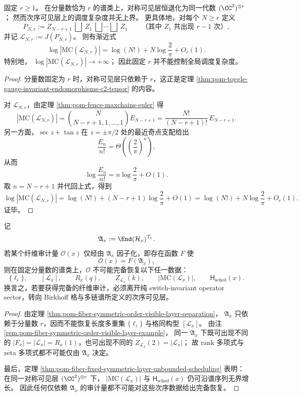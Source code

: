 \begin{theorem}[固定对称可见层下的调度复杂度无界]\label{thm:pom-fiber-fixed-symmetric-layer-unbounded-scheduling}
固定 \(r\ge 1\)。
在分量数恰为 \(r\) 的谱类上，对称可见层恒退化为同一代数 \((\CC^2)^{\otimes r}\)；
然而次序可见层上的调度复杂度并无上界。
更具体地，对每个 \(N\ge r\) 定义
\[
P_{N,r}:=
Z_{N-r+1}\ \bigsqcup\ Z_1\ \bigsqcup\cdots\bigsqcup\ Z_1
\qquad
\text{（其中 \(Z_1\) 共出现 \(r-1\) 次）},
\]
并记
\(
\mathcal L_{N,r}:=J(P_{N,r})
\)。
则有渐近式
\[
\log |\mathrm{MC}(\mathcal L_{N,r})|
=
\log(N!)
+
N\log\frac{2}{\pi}
+
O_r(1).
\]
特别地，
\(
\log |\mathrm{MC}(\mathcal L_{N,r})|\to+\infty
\)；
因此固定 \(r\) 并不能控制全局调度复杂度。
\end{theorem}

\begin{proof}
分量数固定为 \(r\) 时，对称可见层只依赖于 \(r\)，这正是定理 \ref{thm:pom-toggle-gauge-invariant-endomorphisms-c2-tensor} 的内容。
\par
对 \(\mathcal L_{N,r}\)，由定理 \ref{thm:pom-fence-maxchains-euler} 得
\[
|\mathrm{MC}(\mathcal L_{N,r})|
=
\binom{N}{N-r+1,1,\dots,1}E_{N-r+1}
=
\frac{N!}{(N-r+1)!}\,E_{N-r+1}.
\]
另一方面，\(\sec z+\tan z\) 在 \(z=\pm\pi/2\) 处的最近奇点支配给出
\[
\frac{E_n}{n!}=\Theta\!\left(\left(\frac{2}{\pi}\right)^n\right),
\]
从而
\[
\log\frac{E_n}{n!}
=
n\log\frac{2}{\pi}
+
O(1).
\]
取 \(n=N-r+1\) 并代回上式，得到
\[
\log |\mathrm{MC}(\mathcal L_{N,r})|
=
\log(N!)
+
(N-r+1)\log\frac{2}{\pi}
+
O(1)
=
\log(N!)
+
N\log\frac{2}{\pi}
+
O_r(1).
\]
证毕。
\end{proof}

\begin{corollary}\label{cor:pom-fiber-toggle-invariant-audit-incomplete}
记
\[
\mathfrak A_x:=\End(\mathcal H_x)^{\mathcal T_x}.
\]
若某个纤维审计量 \(\mathcal O(x)\) 仅经由 \(\mathfrak A_x\) 因子化，即存在函数 \(F\) 使
\[
\mathcal O(x)=F(\mathfrak A_x),
\]
则在固定分量数的谱类上，\(\mathcal O\) 不可能完备恢复以下任一数据：
\[
\{\ell_i\},
\qquad
[\mathcal L_x],
\qquad
R_x(q),
\qquad
Z_{\mathcal L_x}(k),
\qquad
|\mathrm{MC}(\mathcal L_x)|,
\qquad
\mathsf H_{\mathrm{sched}}(x).
\]
换言之，若要获得完备的纤维审计，必须离开纯 switch-invariant operator sector，转向 Birkhoff 格与多链谱所定义的次序可见层。
\end{corollary}

\begin{proof}
由定理 \ref{thm:pom-fiber-symmetric-order-visible-layer-separation}，
\(\mathfrak A_x\) 只依赖于分量数 \(r\)，因而不能恢复长度多重集 \(\{\ell_i\}\) 与格同构型 \([\mathcal L_x]\)。
由注 \ref{rem:pom-fiber-symmetric-order-visible-layer-example}，
同一 \(\mathfrak A_x\) 下既可出现不同的 \(|F_x|=|\mathcal L_x|=R_x(1)\)，也可出现不同的
\(
Z_{\mathcal L_x}(2)=|\mathcal L_x|
\)；
故 rank 多项式与 zeta 多项式都不可能仅由 \(\mathfrak A_x\) 决定。
\par
最后，定理 \ref{thm:pom-fiber-fixed-symmetric-layer-unbounded-scheduling} 表明：
在同一对称可见层 \((\CC^2)^{\otimes r}\) 下，
\(
|\mathrm{MC}(\mathcal L_x)|
\)
与
\(
\mathsf H_{\mathrm{sched}}(x)
\)
仍可沿谱序列无界增长。
因此任何仅依赖 \(\mathfrak A_x\) 的审计量都不可能对这些次序数据给出完备恢复。
\end{proof}
